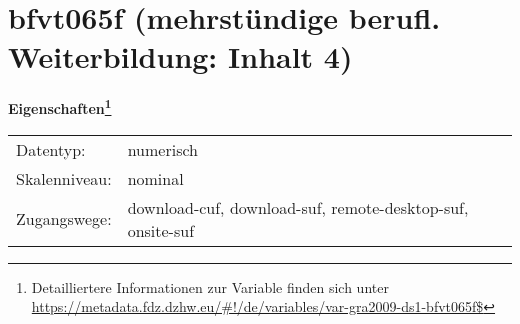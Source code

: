 
    \setcounter{footnote}{0}

    \vspace*{-1.8cm}
	\section{bfvt065f (mehrstündige berufl. Weiterbildung: Inhalt 4)}
	\label{section:bfvt065f}



    \vspace*{0.5cm}
    \noindent\textbf{Eigenschaften\footnote{Detailliertere Informationen zur Variable finden sich unter
		\url{https://metadata.fdz.dzhw.eu/\#!/de/variables/var-gra2009-ds1-bfvt065f$}}}\\
	\begin{tabularx}{\hsize}{@{}lX}
	Datentyp: & numerisch \\
	Skalenniveau: & nominal \\
	Zugangswege: &
	  download-cuf, 
	  download-suf, 
	  remote-desktop-suf, 
	  onsite-suf
 \\
    \end{tabularx}



